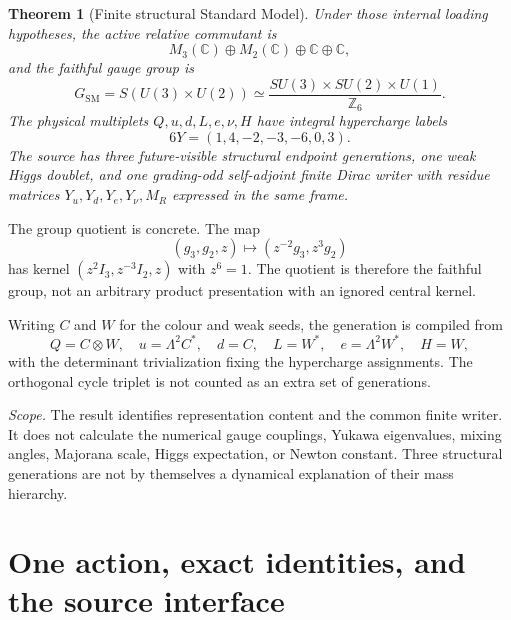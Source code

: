 \documentclass[11pt,a4paper,oneside]{book}
\theoremstyle{plain}
\newtheorem{theorem}{Theorem}[chapter]
\theoremstyle{definition}
\theoremstyle{remark}
\newcommand{\C}{\mathbb C}
\newcommand{\Z}{\mathbb Z}
\newcommand{\GSM}{G_{\mathrm{SM}}}
\newcommand{\src}[2]{\cite{#1}}
\newcommand{\scope}[1]{\par\smallskip\noindent\textit{Scope.} #1\par\smallskip}
\begin{document}
\begin{theorem}[Finite structural Standard Model]
\label{thm:finite-sm}
Under those internal loading hypotheses, the active relative commutant is
\begin{equation}
 M_3(\C)\oplus M_2(\C)\oplus\C\oplus\C,
\end{equation}
and the faithful gauge group is
\begin{equation}
 \GSM=S(U(3)\times U(2))
 \simeq\frac{SU(3)\times SU(2)\times U(1)}{\Z_6}.
 \label{eq:gsm}
\end{equation}
The physical multiplets $Q,u,d,L,e,\nu,H$ have integral hypercharge labels
\begin{equation}
 6Y=(1,4,-2,-3,-6,0,3).
 \label{eq:charges}
\end{equation}
The source has three future-visible structural endpoint generations, one weak Higgs doublet, and one grading-odd self-adjoint finite Dirac writer with residue matrices $Y_u,Y_d,Y_e,Y_\nu,M_R$ expressed in the same frame.
\end{theorem}
\src{GT}{thm:SM-active-SM-I,thm:SM-GT}

The group quotient is concrete. The map
\begin{equation}
 (g_3,g_2,z)\longmapsto(z^{-2}g_3,z^3g_2)
 \label{eq:gsm-map}
\end{equation}
has kernel $(z^2I_3,z^{-3}I_2,z)$ with $z^6=1$. The quotient is therefore the faithful group, not an arbitrary product presentation with an ignored central kernel. \src{GT}{thm:SM-group}

Writing $C$ and $W$ for the colour and weak seeds, the generation is compiled from
\begin{equation}
 Q=C\otimes W,\quad u=\Lambda^2C^*,\quad d=C,\quad
 L=W^*,\quad e=\Lambda^2W^*,\quad H=W,
 \label{eq:multiplet-writers}
\end{equation}
with the determinant trivialization fixing the hypercharge assignments. The orthogonal cycle triplet is not counted as an extra set of generations. \src{GT}{thm:SM-generation}

\scope{The result identifies representation content and the common finite writer. It does not calculate the numerical gauge couplings, Yukawa eigenvalues, mixing angles, Majorana scale, Higgs expectation, or Newton constant. Three structural generations are not by themselves a dynamical explanation of their mass hierarchy.}

\chapter{One action, exact identities, and the source interface}
\label{ch:action}
\end{document}

